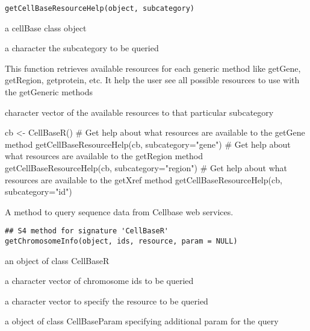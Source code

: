 \documentclass[letterpaper]{book}
\begin{document}
%
\begin{Usage}
\begin{verbatim}
getCellBaseResourceHelp(object, subcategory)
\end{verbatim}
\end{Usage}
%
\begin{Arguments}
\begin{ldescription}
\item[\code{object}] a cellBase class object

\item[\code{subcategory}] a character the subcategory to be queried
\end{ldescription}
\end{Arguments}
%
\begin{Details}\relax
This function retrieves available resources for each generic method
like getGene, getRegion, getprotein, etc. It help the user see all possible 
resources to use with the getGeneric methods
\end{Details}
%
\begin{Value}
character vector of the available resources to that particular 
subcategory
\end{Value}
%
\begin{Examples}
\begin{ExampleCode}
cb <- CellBaseR()
# Get help about what resources are available to the getGene method
getCellBaseResourceHelp(cb, subcategory="gene")
# Get help about what resources are available to the getRegion method
getCellBaseResourceHelp(cb, subcategory="region")
# Get help about what resources are available to the getXref method
getCellBaseResourceHelp(cb, subcategory="id")
\end{ExampleCode}
\end{Examples}
%
\begin{Description}\relax
A method to query sequence data from Cellbase web services.
\end{Description}
%
\begin{Usage}
\begin{verbatim}
## S4 method for signature 'CellBaseR'
getChromosomeInfo(object, ids, resource, param = NULL)
\end{verbatim}
\end{Usage}
%
\begin{Arguments}
\begin{ldescription}
\item[\code{object}] an object of class CellBaseR

\item[\code{ids}] a character vector of chromosome ids to be queried

\item[\code{resource}] a character vector to specify the resource to be queried

\item[\code{param}] a object of class CellBaseParam specifying additional param for
the query
\end{ldescription}
\end{Arguments}
\end{document}
